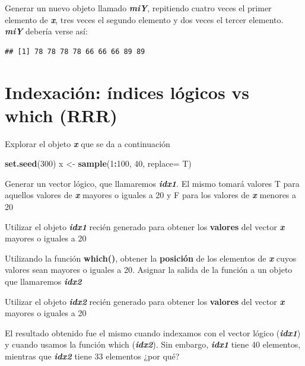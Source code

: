 \documentclass[]{book}
\newenvironment{Shaded}{\begin{snugshade}}{\end{snugshade}}
\newcommand{\DataTypeTok}[1]{\textcolor[rgb]{0.13,0.29,0.53}{#1}}
\newcommand{\DecValTok}[1]{\textcolor[rgb]{0.00,0.00,0.81}{#1}}
\newcommand{\KeywordTok}[1]{\textcolor[rgb]{0.13,0.29,0.53}{\textbf{#1}}}
\newcommand{\NormalTok}[1]{#1}
\newcommand{\OperatorTok}[1]{\textcolor[rgb]{0.81,0.36,0.00}{\textbf{#1}}}
\newcommand{\StringTok}[1]{\textcolor[rgb]{0.31,0.60,0.02}{#1}}
\begin{document}
Generar un nuevo objeto llamado \textbf{\emph{miY}}, repitiendo cuatro veces el primer elemento de \textbf{\emph{x}}, tres veces el segundo elemento y dos veces el tercer elemento. \textbf{\emph{miY}} debería verse así:

\begin{verbatim}
## [1] 78 78 78 78 66 66 66 89 89
\end{verbatim}

\hypertarget{indexaciuxf3n-uxedndices-luxf3gicos-vs-which-rrr}{%
\section{Indexación: índices lógicos vs which (RRR)}\label{indexaciuxf3n-uxedndices-luxf3gicos-vs-which-rrr}}

Explorar el objeto \textbf{\emph{x}} que se da a continuación

\begin{Shaded}
\begin{Highlighting}[]
  \KeywordTok{set.seed}\NormalTok{(}\DecValTok{300}\NormalTok{)}
\NormalTok{  x <-}\StringTok{ }\KeywordTok{sample}\NormalTok{(}\DecValTok{1}\OperatorTok{:}\DecValTok{100}\NormalTok{, }\DecValTok{40}\NormalTok{, }\DataTypeTok{replace=}\NormalTok{ T)}
\end{Highlighting}
\end{Shaded}

Generar un vector lógico, que llamaremos \textbf{\emph{idx1}}. El mismo tomará valores {T} para aquellos valores de \textbf{\emph{x}} mayores o iguales a 20 y {F} para los valores de \textbf{\emph{x}} menores a 20

Utilizar el objeto \textbf{\emph{idx1}} recién generado para obtener los \textbf{valores} del vector \textbf{\emph{x}} mayores o iguales a 20

Utilizando la función \textbf{which()}, obtener la \textbf{posición} de los elementos de \textbf{\emph{x}} cuyos valores sean mayores o iguales a 20. Asignar la salida de la función a un objeto que llamaremos \textbf{\emph{idx2}}

Utilizar el objeto \textbf{\emph{idx2}} recién generado para obtener los \textbf{valores} del vector \textbf{\emph{x}} mayores o iguales a 20

El resultado obtenido fue el mismo cuando indexamos con el vector lógico (\textbf{\emph{idx1}}) y cuando usamos la función which (\textbf{\emph{idx2}}). Sin embargo, \textbf{\emph{idx1}} tiene 40 elementos, mientras que \textbf{\emph{idx2}} tiene 33 elementos ¿por qué?
\end{document}
